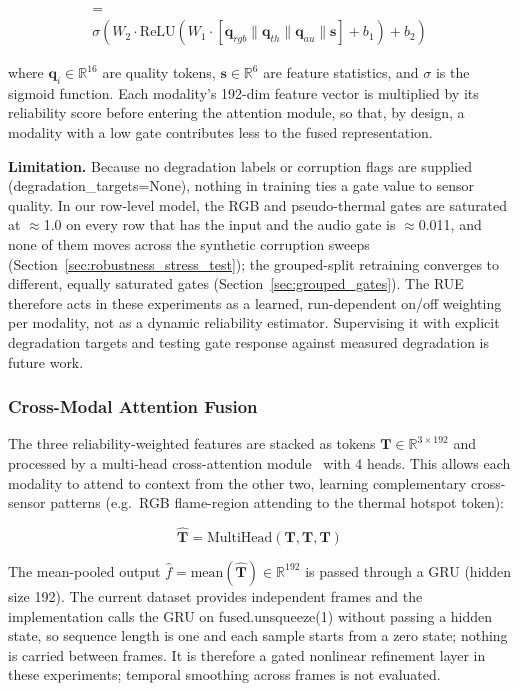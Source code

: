 \documentclass[journal]{IEEEtran}
\begin{document}
\begin{multline}
    [r_{rgb}, r_{th}, r_{au}] = \\ \sigma\!\left(W_2 \cdot \text{ReLU}(W_1 \cdot [\mathbf{q}_{rgb}\|\mathbf{q}_{th}\|\mathbf{q}_{au}\|\mathbf{s}] + b_1) + b_2\right)
\end{multline}

where $\mathbf{q}_i \in \mathbb{R}^{16}$ are quality tokens, $\mathbf{s} \in \mathbb{R}^6$ are feature statistics, and $\sigma$ is the sigmoid function. Each modality's 192-dim feature vector is multiplied by its reliability score before entering the attention module, so that, by design, a modality with a low gate contributes less to the fused representation.

\textbf{Limitation.} Because no degradation labels or corruption flags are supplied (degradation\_targets=None), nothing in training ties a gate value to sensor quality. In our row-level model, the RGB and pseudo-thermal gates are saturated at $\approx$1.0 on every row that has the input and the audio gate is $\approx$0.011, and none of them moves across the synthetic corruption sweeps (Section~\ref{sec:robustness_stress_test}); the grouped-split retraining converges to different, equally saturated gates (Section~\ref{sec:grouped_gates}). The RUE therefore acts in these experiments as a learned, run-dependent on/off weighting per modality, not as a dynamic reliability estimator. Supervising it with explicit degradation targets and testing gate response against measured degradation is future work.

\subsubsection{Cross-Modal Attention Fusion}

The three reliability-weighted features are stacked as tokens $\mathbf{T} \in \mathbb{R}^{3 \times 192}$ and processed by a multi-head cross-attention module~\cite{vaswani2017attention} with 4 heads. This allows each modality to attend to context from the other two, learning complementary cross-sensor patterns (e.g.\ RGB flame-region attending to the thermal hotspot token):

\begin{equation}
    \hat{\mathbf{T}} = \text{MultiHead}(\mathbf{T}, \mathbf{T}, \mathbf{T})
\end{equation}

The mean-pooled output $\hat{f} = \text{mean}(\hat{\mathbf{T}}) \in \mathbb{R}^{192}$ is passed through a GRU (hidden size 192). The current dataset provides independent frames and the implementation calls the GRU on fused.unsqueeze(1) without passing a hidden state, so sequence length is one and each sample starts from a zero state; nothing is carried between frames. It is therefore a gated nonlinear refinement layer in these experiments; temporal smoothing across frames is not evaluated.
\end{document}
